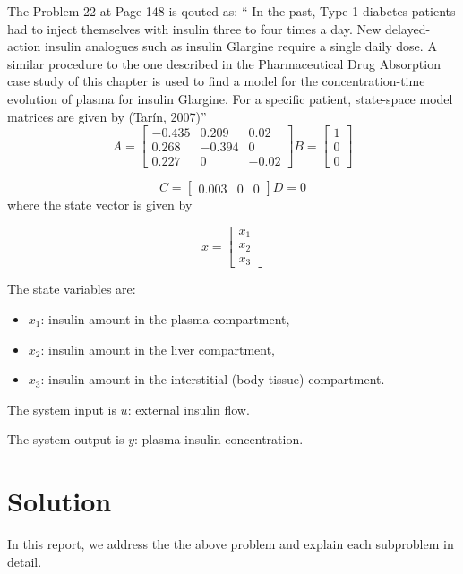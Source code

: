 \documentclass{article}
\begin{document}
The Problem 22 at Page 148 is qouted as:
"`
In the past, Type-1 diabetes patients had to inject themselves with insulin three to four times a day.
New delayed-action insulin analogues such as insulin Glargine require a single daily dose. A similar procedure to
the one described in the Pharmaceutical Drug Absorption case study of this chapter is used to find a model for
the concentration-time evolution of plasma for insulin Glargine. For a specific patient, state-space model matrices
are given by (Tarín, 2007)"'
\vskip10pt
\[
A = \begin{bmatrix}
-0.435 & 0.209 & 0.02\\
0.268 & -0.394 & 0\\
0.227 & 0 & -0.02\end{bmatrix}
B = \begin{bmatrix}
1 \\
0 \\
0 
\end{bmatrix}
\]

\[
C=\begin{bmatrix}
0.003 & 0 & 0
\end{bmatrix}
D = 0
\]
where the state vector is given by

\[
x = \begin{bmatrix}
x_1 \\
x_2 \\
x_3
\end{bmatrix}
\]

The state variables are:
\begin{itemize}
    \item \(x_1\): insulin amount in the plasma compartment,
    \item \(x_2\): insulin amount in the liver compartment,
    \item \(x_3\): insulin amount in the interstitial (body tissue) compartment.
\end{itemize}

The system input is \(u\): external insulin flow.

The system output is \(y\): plasma insulin concentration.
\vskip30pt

\section{Solution}
In this report, we address the the above problem and explain each subproblem in detail.
\end{document}
